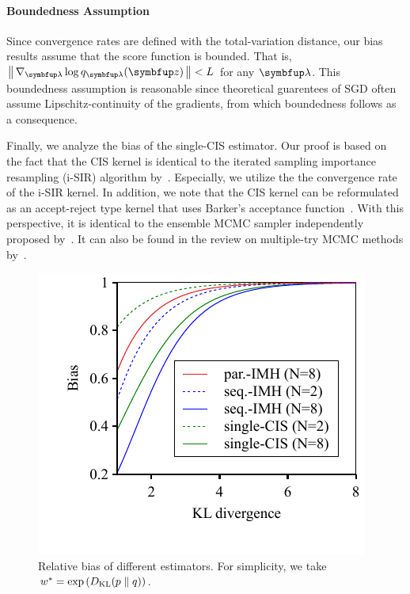 \paragraph{Boundedness Assumption}
Since convergence rates are defined with the total-variation distance, our bias results assume that the score function is bounded.
That is, \(\norm{\nabla_{\vlambda} \log q_{\vlambda}(\vz)} < L\) for any \(\vlambda\).
This boundedness assumption is reasonable since theoretical guarentees of SGD often assume Lipschitz-continuity of the gradients, from which boundedness follows as a consequence.

%

%

%
Finally, we analyze the bias of the single-CIS estimator.
Our proof is based on the fact that the CIS kernel is identical to the iterated sampling importance resampling (i-SIR) algorithm by~\citet{andrieu_uniform_2018}.
Especially, we utilize the the convergence rate of the i-SIR kernel.
In addition, we note that the CIS kernel can be reformulated as an accept-reject type kernel that uses Barker's acceptance function~\citep{barker_monte_1965}.
With this perspective, it is identical to the ensemble MCMC sampler independently proposed by~\citet{austad_parallel_2007, neal_mcmc_2011a}.
It can also be found in the review on multiple-try MCMC methods by~\citet[Table 12]{martino_review_2018a}.
%

%
\begin{figure}[H]
  \centering
  \includegraphics[scale=0.8]{figures/bias_01.pdf}
  \caption{Relative bias of different estimators.
  For simplicity, we take \(w^* = \exp\left( D_{\mathrm{KL}}(p\parallel q) \right)\).}\label{fig:bias}
\end{figure}
%
